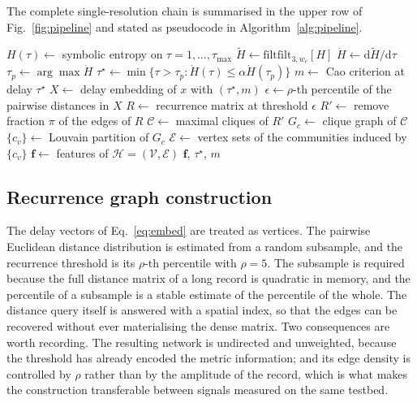 \documentclass[10pt,a4paper,twocolumn]{article}
\begin{document}
The complete single-resolution chain is summarised in the upper row of
Fig.~\ref{fig:pipeline} and stated as pseudocode in
Algorithm~\ref{alg:pipeline}.

\begin{algorithm}[t]
\small
\caption{single-resolution hypergraph descriptor of one record}
\label{alg:pipeline}
$H(\tau) \leftarrow$ symbolic entropy on $\tau = 1,\dots,\tau_{\max}$\;
$\widetilde{H} \leftarrow \mathrm{filtfilt}_{3,w_c}[H]$\;
$\dot{H} \leftarrow \mathrm{d}\widetilde{H}/\mathrm{d}\tau$\;
$\tau_p \leftarrow \arg\max \dot{H}$\;
$\tau^{\star} \leftarrow \min\{\tau > \tau_p : \dot{H}(\tau) \le \alpha
\dot{H}(\tau_p)\}$\;
$m \leftarrow$ Cao criterion at delay $\tau^{\star}$\;
$X \leftarrow$ delay embedding of $x$ with $(\tau^{\star}, m)$\;
$\epsilon \leftarrow \rho$-th percentile of the pairwise distances in $X$\;
$R \leftarrow$ recurrence matrix at threshold $\epsilon$\;
$R' \leftarrow$ remove fraction $\pi$ of the edges of $R$\;
$\mathcal{C} \leftarrow$ maximal cliques of $R'$\;
$G_c \leftarrow$ clique graph of $\mathcal{C}$\;
$\{c_v\} \leftarrow$ Louvain partition of $G_c$\;
$\mathcal{E} \leftarrow$ vertex sets of the communities induced by $\{c_v\}$\;
$\mathbf{f} \leftarrow$ features of $\mathcal{H} = (\mathcal{V},\mathcal{E})$\;
\Return $\mathbf{f}$, $\tau^{\star}$, $m$
\end{algorithm}

\subsection{Recurrence graph construction}
\label{sec:recgraph}

The delay vectors of Eq.~\eqref{eq:embed} are treated as vertices.  The
pairwise Euclidean distance distribution is estimated from a random subsample,
and the recurrence threshold is its $\rho$-th percentile with $\rho = 5$.  The
subsample is required because the full distance matrix of a long record is
quadratic in memory, and the percentile of a subsample is a stable estimate
of the percentile of the whole.  The distance query itself is answered with a
spatial index, so that the edges can be recovered without ever materialising
the dense matrix.  Two consequences are worth recording.  The resulting
network is undirected and unweighted, because the threshold has already
encoded the metric information; and its edge density is controlled by $\rho$
rather than by the amplitude of the record, which is what makes the
construction transferable between signals measured on the same testbed.
\end{document}
